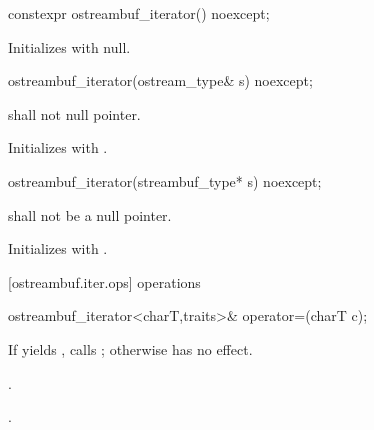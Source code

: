 \begin{addedblock}
%
\begin{itemdecl}
constexpr ostreambuf_iterator() noexcept;
\end{itemdecl}

\begin{itemdescr}
\pnum
\effects
Initializes  with null.
\end{itemdescr}
\end{addedblock}

%
\begin{itemdecl}
ostreambuf_iterator(ostream_type& s) noexcept;
\end{itemdecl}

\begin{itemdescr}
\pnum
\requires
{}
shall not null pointer.
\end{itemdescr}

\begin{itemdescr}
\pnum
\effects
Initializes  with .
\end{itemdescr}


%
\begin{itemdecl}
ostreambuf_iterator(streambuf_type* s) noexcept;
\end{itemdecl}

\begin{itemdescr}
\pnum
\requires
{}
shall not be a null pointer.

\pnum
\effects
Initializes  with .
\end{itemdescr}

[ostreambuf.iter.ops]{ operations}

%
\begin{itemdecl}
ostreambuf_iterator<charT,traits>&
  operator=(charT c);
\end{itemdecl}

\begin{itemdescr}
\pnum
\effects
If
yields
,
calls
;
otherwise has no effect.

\begin{addedblock}
\pnum
\requires {}.
\end{addedblock}

\pnum
\returns
{}.
\end{itemdescr}

